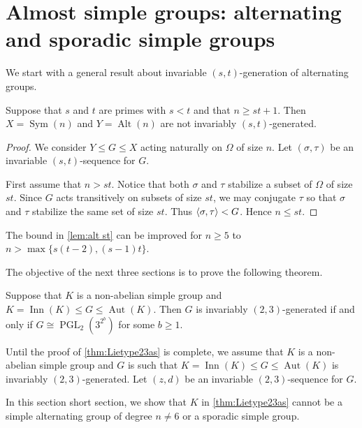 \documentclass[12pt,a4paper]{amsart}
\DeclareMathOperator{\Aut}{Aut}
\DeclareMathOperator{\Inn}{Inn}
\DeclareMathOperator{\PGL}{PGL}
\DeclareMathOperator{\Alt}{Alt}
\DeclareMathOperator{\Sym}{Sym}
\DeclarePairedDelimiter{\gen}{\langle}{\rangle}
\begin{document}
\section{Almost simple groups: alternating and sporadic simple groups}\label{sec:5}

We start with a general result about invariable $(s,t)$-generation of alternating groups.

 \begin{proposition}\label{lem:alt st}
 Suppose that $s$ and $t$ are primes with $s<t$ and that $n \ge st+1$.  Then $X=\Sym(n)$ and $Y=\Alt(n)$ are not invariably $(s,t)$-generated.
 \end{proposition}

\begin{proof}    We consider $Y \le G\le X$ acting naturally on $\Omega$ of size $n$. Let $(\sigma,\tau)$ be an invariable $(s,t)$-sequence for $G$.

First assume that $n>st$. Notice that both $\sigma$ and $\tau$    stabilize a subset   of $\Omega$ of size  $st$.  Since     $G$  acts transitively on subsets of size $st$, we may conjugate $\tau$ so that $\sigma$ and $\tau$ stabilize the same set of size $st$. Thus $\gen{\sigma,\tau}< G$.  Hence $n \le st$.
\end{proof}

\begin{remark}
The bound in \cref{lem:alt st} can be improved for $n \ge 5$ to $n> \max\{s(t-2),(s-1)t\}$.
\end{remark}


The objective of the next three sections is to prove the following theorem.


 \begin{theorem}\label{thm:Lietype23as} Suppose that $K$ is a non-abelian simple group  and $K=\Inn(K)\le G \le \Aut(K)$.
 Then $G$ is invariably $(2,3)$-generated if and only if
   $G  \cong \PGL_2(3^{2^b})$ for some $b\ge 1$.
 \end{theorem}

Until the proof of \cref{thm:Lietype23as} is complete, we assume that $K$ is a non-abelian simple group and $G$ is such that
 $K=\Inn(K)\le G \le \Aut(K)$  is invariably $(2,3)$-generated. Let $(z,d)$ be an invariable $(2,3)$-sequence for $G$.


In this section short section, we show that $K$ in \cref{thm:Lietype23as} cannot be a simple alternating group of degree $n \ne 6$ or a sporadic simple group.
\end{document}

